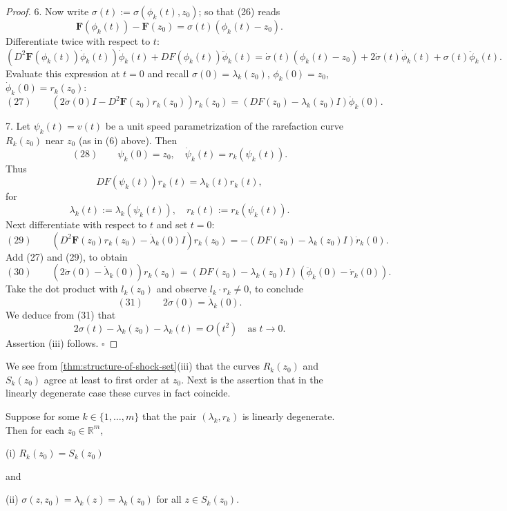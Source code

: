 \begin{proof}
6. Now write $\sigma(t) := \sigma(\phi_k(t),z_0)$; so that (26) reads
$$\mathbf{F}(\phi_k(t)) - \mathbf{F}(z_0) = \sigma(t)(\phi_k(t)-z_0).$$
Differentiate twice with respect to $t$:
$$(D^2\mathbf{F}(\phi_k(t))\dot\phi_k(t))\dot\phi_k(t) + DF(\phi_k(t))\ddot\phi_k(t) = \dot\sigma(t)(\phi_k(t)-z_0) + 2\dot\sigma(t)\dot\phi_k(t) + \sigma(t)\ddot\phi_k(t).$$
Evaluate this expression at $t=0$ and recall $\sigma(0)=\lambda_k(z_0)$, $\phi_k(0)=z_0$, $\dot\phi_k(0)=r_k(z_0)$:
$$(27) \qquad (2\dot\sigma(0)I - D^2\mathbf{F}(z_0)r_k(z_0))r_k(z_0) = (DF(z_0)-\lambda_k(z_0)I)\ddot\phi_k(0).$$

7. Let $\psi_k(t) = v(t)$ be a unit speed parametrization of the rarefaction curve $R_k(z_0)$ near $z_0$ (as in (6) above). Then
$$(28) \qquad \psi_k(0) = z_0, \quad \dot\psi_k(t) = r_k(\psi_k(t)).$$
Thus
$$DF(\psi_k(t))r_k(t) = \lambda_k(t)r_k(t),$$
for
$$\lambda_k(t) := \lambda_k(\psi_k(t)), \quad r_k(t) := r_k(\psi_k(t)).$$
Next differentiate with respect to $t$ and set $t=0$:
$$(29) \qquad (D^2\mathbf{F}(z_0)r_k(z_0) - \dot\lambda_k(0)I)r_k(z_0) = -(DF(z_0)-\lambda_k(z_0)I)\dot r_k(0).$$
Add (27) and (29), to obtain
$$(30) \qquad (2\dot\sigma(0) - \dot\lambda_k(0))r_k(z_0) = (DF(z_0)-\lambda_k(z_0)I)(\ddot\phi_k(0)-\dot r_k(0)).$$
Take the dot product with $l_k(z_0)$ and observe $l_k\cdot r_k\neq 0$, to conclude
$$(31) \qquad 2\dot\sigma(0) = \dot\lambda_k(0).$$
We deduce from (31) that
$$2\sigma(t) - \lambda_k(z_0) - \lambda_k(t) = O(t^2) \quad \text{as } t\to 0.$$
Assertion (iii) follows. $\square$
\end{proof}

We see from \cref{thm:structure-of-shock-set}(iii) that the curves $R_k(z_0)$ and $S_k(z_0)$ agree at least to first order at $z_0$. Next is the assertion that in the linearly degenerate case these curves in fact coincide.

\begin{theorem}
\label{thm:linear-degeneracy-shock-rarefaction-coincide}
Suppose for some $k\in\{1,\ldots,m\}$ that the pair $(\lambda_k, r_k)$ is linearly degenerate. Then for each $z_0\in\mathbb{R}^m$,

(i) $R_k(z_0) = S_k(z_0)$

and

(ii) $\sigma(z,z_0) = \lambda_k(z) = \lambda_k(z_0)$ for all $z\in S_k(z_0)$.
\end{theorem}

